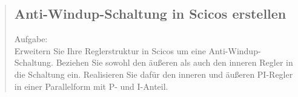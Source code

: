 \begin{quote}
\begin{quote}
\begin{quote}
		\end{quote}
		
	\end{quote}
	
	\subsection{Anti-Windup-Schaltung in Scicos erstellen}
	Aufgabe:\\
    Erweitern Sie Ihre Reglerstruktur in Scicos um eine Anti-Windup-Schaltung. Beziehen Sie sowohl
    den äußeren als auch den inneren Regler in die Schaltung ein. Realisieren Sie dafür den inneren und äußeren
    PI-Regler in einer Parallelform mit P- und I-Anteil.
	\begin{quote}
		
		
	\end{quote}
	
\end{quote}


